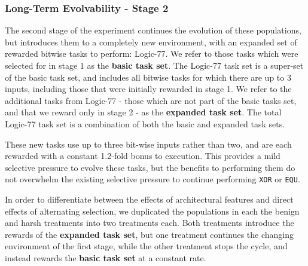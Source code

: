 \documentclass[10pt,letterpaper]{article}
\begin{document}
\subsubsection*{Long-Term Evolvability - Stage 2}
The second stage of the experiment continues the evolution of these populations, but introduces them to a completely new environment, with an expanded set of rewarded bitwise tasks to perform: Logic-77. We refer to those tasks which were selected for in stage 1 as the \textbf{basic task set}. The Logic-77 task set is a super-set of the basic task set, and includes all bitwise tasks for which there are up to 3 inputs, including those that were initially rewarded in stage 1. We refer to the additional tasks from Logic-77 - those which are not part of the basic tasks set, and that we reward only in stage 2 - as the \textbf{expanded task set}. The total Logic-77 task set is a combination of both the basic and expanded task sets.  

These new tasks use up to three bit-wise inputs rather than two, and are each rewarded with a constant 1.2-fold bonus to execution. This provides a mild selective pressure to evolve these tasks, but the benefits to performing them do not overwhelm the existing selective pressure to continue performing \texttt{XOR} or \texttt{EQU}.

In order to differentiate between the effects of architectural features and direct effects of alternating selection, we duplicated the populations in each the benign and harsh treatments into two treatments each. Both treatments introduce the rewards of the \textbf{expanded task set}, but one treatment continues the changing environment of the first stage, while the other treatment stops the cycle, and instead rewards the \textbf{basic task set} at a constant rate.
\end{document}

